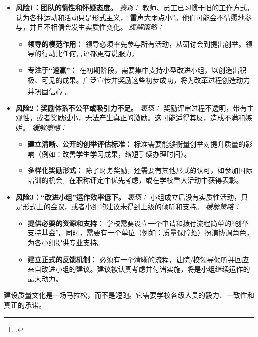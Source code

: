 \begin{itemize}
    \item \textbf{风险1：团队的惰性和怀疑态度。}
    \textit{表现：} 教师、员工已习惯于旧的工作方式，认为各种运动和活动只是形式主义，“雷声大雨点小”。他们可能会不情愿地参与，并且不相信会发生实质性变化。
    \textit{缓解策略：}
    \begin{itemize}
        \item \textbf{领导的模范作用：} 领导必须率先参与所有活动，从研讨会到提出创举。领导的行动比任何言语都更有说服力。
        \item \textbf{专注于“速赢”：} 在初期阶段，需要集中支持小型改进小组，以创造出积极、可见的成果。广泛宣传并奖励这些初步成功，将为改革过程创造动力并巩固信心\footcite{kotter_leading_change}。
    \end{itemize}

    \item \textbf{风险2：奖励体系不公平或吸引力不足。}
    \textit{表现：} 奖励评审过程不透明，带有主观性，或者奖励过小，无法产生真正的激励。这可能适得其反，造成不满和嫉妒。
    \textit{缓解策略：}
    \begin{itemize}
        \item \textbf{建立清晰、公开的创举评估标准：} 标准需要能够衡量创举对提升质量的影响（例如：改善学生学习成果，缩短手续办理时间）。
        \item \textbf{多样化奖励形式：} 除了财务奖励，还需要有其他形式的认可，如参加国际培训的机会，在职称评定中优先考虑，或在学校重大活动中获得表彰。
    \end{itemize}

    \item \textbf{风险3：“改进小组”运作效率低下。}
    \textit{表现：} 小组成立后没有实质性活动，只是形式上的会议，或者小组的建议未得到上级的倾听和支持。
    \textit{缓解策略：}
    \begin{itemize}
        \item \textbf{提供必要的资源和支持：} 学校需要设立一个申请和拨付流程简单的“创举支持基金”。同时，需要有一个单位（例如：质量保障处）扮演协调角色，为各小组提供专业支持。
        \item \textbf{建立正式的反馈机制：} 必须有一个清晰的流程，让院/校领导倾听并回应来自改进小组的建议。建议被认真考虑并付诸实施，将是小组继续运作的最大动力。
    \end{itemize}
\end{itemize}

建设质量文化是一场马拉松，而不是短跑。它需要学校各级人员的毅力、一致性和真正的承诺。
































